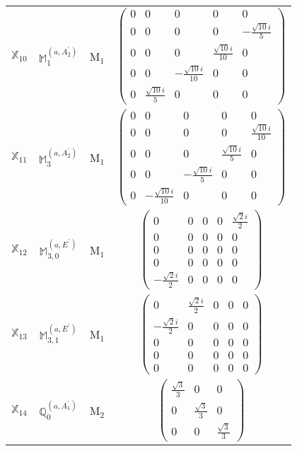 \documentclass[fleqn,10pt,landscape]{article}
\begin{document}
\begin{itemize}
\begin{center}
\begin{longtable}{c|c|c|c}
$ \mathbb{X}_{10} $ & $\mathbb{M}_{1}^{(a,A_{2}^{\prime})}$ & M$_{1}$ & $\begin{pmatrix} 0 & 0 & 0 & 0 & 0 \\ 0 & 0 & 0 & 0 & - \frac{\sqrt{10} i}{5} \\ 0 & 0 & 0 & \frac{\sqrt{10} i}{10} & 0 \\ 0 & 0 & - \frac{\sqrt{10} i}{10} & 0 & 0 \\ 0 & \frac{\sqrt{10} i}{5} & 0 & 0 & 0 \end{pmatrix}$ \\
$ \mathbb{X}_{11} $ & $\mathbb{M}_{3}^{(a,A_{2}^{\prime})}$ & M$_{1}$ & $\begin{pmatrix} 0 & 0 & 0 & 0 & 0 \\ 0 & 0 & 0 & 0 & \frac{\sqrt{10} i}{10} \\ 0 & 0 & 0 & \frac{\sqrt{10} i}{5} & 0 \\ 0 & 0 & - \frac{\sqrt{10} i}{5} & 0 & 0 \\ 0 & - \frac{\sqrt{10} i}{10} & 0 & 0 & 0 \end{pmatrix}$ \\
$ \mathbb{X}_{12} $ & $\mathbb{M}_{3,0}^{(a,E^{\prime})}$ & M$_{1}$ & $\begin{pmatrix} 0 & 0 & 0 & 0 & \frac{\sqrt{2} i}{2} \\ 0 & 0 & 0 & 0 & 0 \\ 0 & 0 & 0 & 0 & 0 \\ 0 & 0 & 0 & 0 & 0 \\ - \frac{\sqrt{2} i}{2} & 0 & 0 & 0 & 0 \end{pmatrix}$ \\
$ \mathbb{X}_{13} $ & $\mathbb{M}_{3,1}^{(a,E^{\prime})}$ & M$_{1}$ & $\begin{pmatrix} 0 & \frac{\sqrt{2} i}{2} & 0 & 0 & 0 \\ - \frac{\sqrt{2} i}{2} & 0 & 0 & 0 & 0 \\ 0 & 0 & 0 & 0 & 0 \\ 0 & 0 & 0 & 0 & 0 \\ 0 & 0 & 0 & 0 & 0 \end{pmatrix}$ \\ \hline
$ \mathbb{X}_{14} $ & $\mathbb{Q}_{0}^{(a,A_{1}^{\prime})}$ & M$_{2}$ & $\begin{pmatrix} \frac{\sqrt{3}}{3} & 0 & 0 \\ 0 & \frac{\sqrt{3}}{3} & 0 \\ 0 & 0 & \frac{\sqrt{3}}{3} \end{pmatrix}$ \\

\end{longtable}
\end{center}
\end{itemize}
\end{document}

